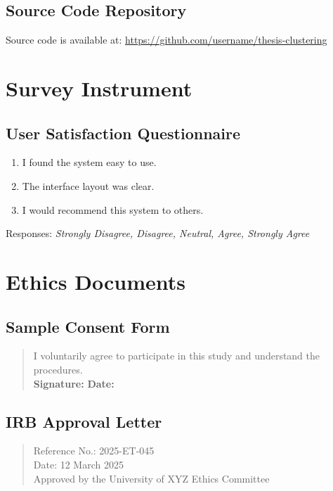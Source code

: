 \documentclass[a4paper,11pt]{report}
\begin{document}
\section*{Source Code Repository}
Source code is available at: \url{https://github.com/username/thesis-clustering}

\chapter{Survey Instrument}
\label{appendix:survey}

\section*{User Satisfaction Questionnaire}
\begin{enumerate}
  \item I found the system easy to use.
  \item The interface layout was clear.
  \item I would recommend this system to others.
\end{enumerate}

Responses: \textit{Strongly Disagree, Disagree, Neutral, Agree, Strongly Agree}

\chapter{Ethics Documents}
\label{appendix:ethics}

\section*{Sample Consent Form}
\begin{quote}
I voluntarily agree to participate in this study and understand the procedures.\\
\textbf{Signature:} \hrulefill \hspace{1cm} \textbf{Date:} \hrulefill
\end{quote}

\section*{IRB Approval Letter}
\begin{quote}
Reference No.: 2025-ET-045\\
Date: 12 March 2025\\
Approved by the University of XYZ Ethics Committee
\end{quote}
\end{document}
